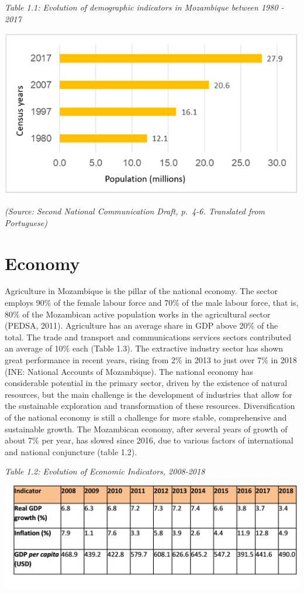 \documentclass[
]{book}
\begin{document}
\emph{Table 1.1: Evolution of demographic indicators in Mozambique between 1980 - 2017}

\includegraphics{Figure5.png}

\emph{(Source: Second National Communication Draft, p.~4-6. Translated from Portuguese)}

\hypertarget{economy}{%
\section{Economy}\label{economy}}

Agriculture in Mozambique is the pillar of the national economy. The sector employs 90\% of the female labour force and 70\% of the male labour force, that is, 80\% of the Mozambican active population works in the agricultural sector (PEDSA, 2011). Agriculture has an average share in GDP above 20\% of the total. The trade and transport and communications services sectors contributed an average of 10\% each (Table 1.3). The extractive industry sector has shown great performance in recent years, rising from 2\% in 2013 to just over 7\% in 2018 (INE: National Accounts of Mozambique). The national economy has considerable potential in the primary sector, driven by the existence of natural resources, but the main challenge is the development of industries that allow for the sustainable exploration and transformation of these resources. Diversification of the national economy is still a challenge for more stable, comprehensive and sustainable growth. The Mozambican economy, after several years of growth of about 7\% per year, has slowed since 2016, due to various factors of international and national conjuncture (table 1.2).

\emph{Table 1.2: Evolution of Economic Indicators, 2008-2018}

\includegraphics{Figure7.png}
\end{document}
